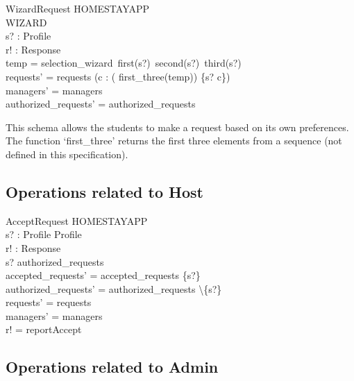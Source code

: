 \documentclass[11pt]{article}
\begin{document}
\begin{schema}{WizardRequest}
	\Delta HOMESTAYAPP\\
	\Xi WIZARD\\
	s? : Profile\\
	r! : Response\\
\where
	temp = selection\_wizard\ first(\ran s?)\ second(\ran s?)\ third(\ran s?)\\
	requests' = requests \cup (\forall c : \ran( first\_three(temp)) \bullet \{s? \mapsto c\})\\
	managers' = managers\\
	authorized_requests' = authorized_requests\\
\end{schema}
This schema allows the students to make a request based on its own preferences. The function `first\_three' returns the first three elements from a sequence (not defined in this specification).


\subsection*{Operations related to Host}

\begin{schema}{AcceptRequest}
	\Delta HOMESTAYAPP\\
	s? : Profile \rightarrow Profile\\
	r! : Response\\
\where
	s? \in authorized\_requests\\
	accepted\_requests' = accepted\_requests \cup \{s?\}\\
	authorized\_requests' = authorized\_requests \backslash \{s?\}\\
	requests' = requests\\
	managers' = managers\\
	r! = reportAccept\\
\end{schema}


\subsection*{Operations related to Admin}
\end{document}
